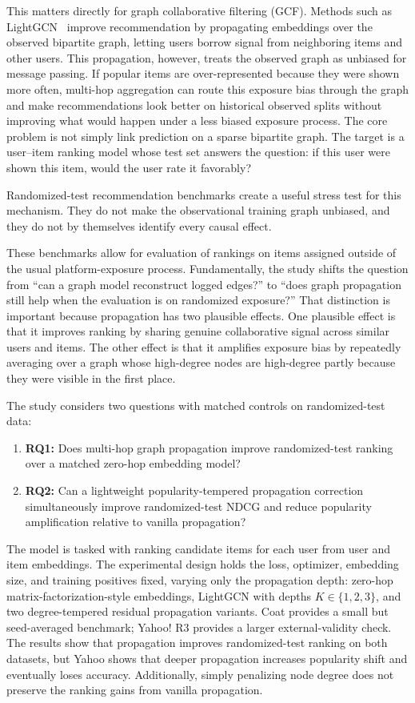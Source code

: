 \documentclass[10pt]{article}
\begin{document}
This matters directly for graph collaborative filtering (GCF). Methods such as LightGCN~\citep{he2020} improve recommendation by propagating embeddings over the observed bipartite graph, letting users borrow signal from neighboring items and other users. This propagation, however, treats the observed graph as unbiased for message passing. If popular items are over-represented because they were shown more often, multi-hop aggregation can route this exposure bias through the graph and make recommendations look better on historical observed splits without improving what would happen under a less biased exposure process. The core problem is not simply link prediction on a sparse bipartite graph. The target is a user--item ranking model whose test set answers the question: if this user were shown this item, would the user rate it favorably?

Randomized-test recommendation benchmarks create a useful stress test for this mechanism. They do not make the observational training graph unbiased, and they do not by themselves identify every causal effect. 

These benchmarks allow for evaluation of rankings on items assigned outside of the usual platform-exposure process. Fundamentally, the study shifts the question from ``can a graph model reconstruct logged edges?'' to ``does graph propagation still help when the evaluation is on randomized exposure?'' That distinction is important because propagation has two plausible effects. One plausible effect is that it improves ranking by sharing genuine collaborative signal across similar users and items. The other effect is that it amplifies exposure bias by repeatedly averaging over a graph whose high-degree nodes are high-degree partly because they were visible in the first place.

The study considers two questions with matched controls on randomized-test data:

\begin{enumerate}
  \item \textbf{RQ1:} Does multi-hop graph propagation improve randomized-test ranking over a matched zero-hop embedding model?
  \item \textbf{RQ2:} Can a lightweight popularity-tempered propagation correction simultaneously improve randomized-test NDCG and reduce popularity amplification relative to vanilla propagation?
\end{enumerate}

The model is tasked with ranking candidate items for each user from user and item embeddings. The experimental design holds the loss, optimizer, embedding size, and training positives fixed, varying only the propagation depth: zero-hop matrix-factorization-style embeddings, LightGCN with depths $K\in\{1,2,3\}$, and two degree-tempered residual propagation variants. Coat provides a small but seed-averaged benchmark; Yahoo! R3 provides a larger external-validity check. The results show that propagation improves randomized-test ranking on both datasets, but Yahoo shows that deeper propagation increases popularity shift and eventually loses accuracy. Additionally, simply penalizing node degree does not preserve the ranking gains from vanilla propagation.
\end{document}
